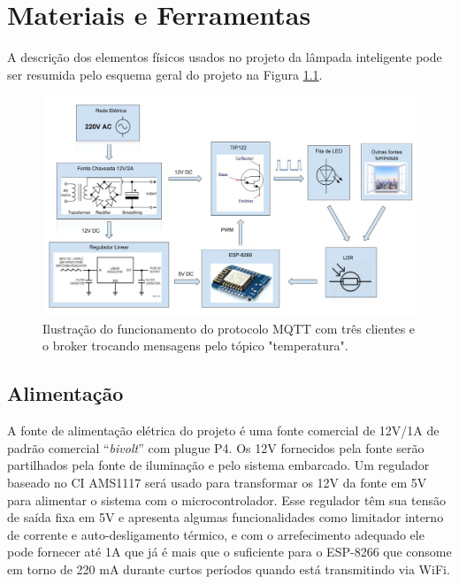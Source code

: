 \chapter{Materiais e Ferramentas}

A descrição dos elementos físicos usados no projeto da lâmpada inteligente pode ser resumida pelo esquema geral do projeto na Figura \ref{esquema}.

\begin{figure}[ht]
    \begin{center}
    \includegraphics[width=\textwidth]{figuras/esquema_eletrico.jpg}
    \end{center}
    \caption[Esquema geral do projeto da fita de LED MQTT.]{Ilustração do funcionamento do protocolo MQTT com três clientes e o broker trocando mensagens pelo tópico "temperatura".}
    \label{esquema}
\end{figure}

\section{Alimentação}

A fonte de alimentação elétrica do projeto é uma fonte comercial de 12V/1A de padrão comercial “\textit{bivolt}” com plugue P4. Os 12V fornecidos pela fonte serão partilhados pela fonte de iluminação e pelo sistema embarcado. Um regulador baseado no CI AMS1117 será usado para transformar os 12V da fonte em 5V para alimentar o sistema com o microcontrolador. Esse regulador têm sua tensão de saída fixa em 5V e apresenta algumas funcionalidades como limitador interno de corrente e auto-desligamento térmico, e com o arrefecimento adequado ele pode fornecer até 1A que já é mais que o suficiente para o ESP-8266 que consome em torno de 220 mA durante curtos períodos quando está transmitindo via WiFi.

